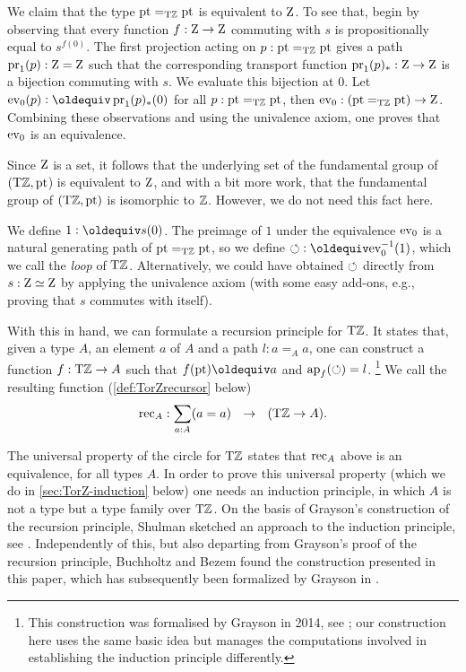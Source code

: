 \documentclass[a4paper,12pt]{amsart}
\begin{document}
{We claim}
that the type ${\mathord{\mathrm{pt}}} =_{\mathrm{T}\mathbb{Z}} {\mathord{\mathrm{pt}}}$ is equivalent to $\mathrm{Z}$.
To see that,
begin by observing that every function $f:\mathrm{Z}\to\mathrm{Z}$ commuting with $s$
is propositionally equal to $s^{f(0)}$.  The first projection
acting on $p : {\mathord{\mathrm{pt}}} =_{\mathrm{T}\mathbb{Z}} {\mathord{\mathrm{pt}}}$ gives a path $\operatorname{pr}_1(p) : \mathrm{Z}=\mathrm{Z}$
such that the corresponding transport function $\operatorname{pr}_1(p)_* : \mathrm{Z}\to\mathrm{Z}$
is a bijection commuting with $s$. We evaluate this bijection {at} $0$.
Let $\ev_0(p) \defeq \pr_1(p)_*(0)$ for all $p : {\mathord{\mathrm{pt}}} =_{\mathrm{T}\mathbb{Z}} {\mathord{\mathrm{pt}}}$,
then $\mathrm{ev}_0 : ({\mathord{\mathrm{pt}}} =_{\mathrm{T}\mathbb{Z}} {\mathord{\mathrm{pt}}}) \to \mathrm{Z}$.  Combining these observations {and}
using the univalence axiom, one proves that $\mathrm{ev}_0$ is an equivalence.

Since $\mathrm{Z}$ is a set, it follows that the underlying set of the fundamental group of $({\mathrm{T}\mathbb{Z}},{\mathord{\mathrm{pt}}}$) is equivalent to $\mathrm{Z}$,
and with a bit more work, that the fundamental group of $({\mathrm{T}\mathbb{Z}},{\mathord{\mathrm{pt}}})$ is isomorphic to $\mathbb{Z}$.
However, we do not need this fact here.

We define $1 \defeq s(0)$.
The preimage of $1$ under the equivalence $\mathrm{ev}_0$ is a
natural generating path of ${\mathord{\mathrm{pt}}} =_{\mathrm{T}\mathbb{Z}} {\mathord{\mathrm{pt}}}$, so we define
${\Zloop}\defeq \ev_0^{-1}(1)$, which we call the \emph{loop}
of ${\mathrm{T}\mathbb{Z}}$. Alternatively, we could have obtained ${\circlearrowleft}$
directly from $s: \mathrm{Z}\simeq\mathrm{Z}$ by applying the univalence axiom
(with some easy add-ons, e.g., proving that $s$ commutes with itself).

With this in hand, we can formulate a recursion principle for ${\mathrm{T}\mathbb{Z}}$.
It states that, given a type $A$, an element $a$ of $A$ and a
path $l:a=_A a$, one can construct a function $f:{\mathrm{T}\mathbb{Z}}\to A$
such that $f(\pt)\jdeq a$ and $\mathop{{\mathrm{ap}}_{f}}({\circlearrowleft})=l$.%
\footnote{This construction was formalised by Grayson
in 2014, see \cite{circlerec-Dan}; our construction here uses the
same basic idea but manages the computations involved in establishing the
induction principle differently.}  We call the resulting function
(\cref{def:TorZrecursor} below)
\[
{\mathop{\mathrm{rec}}}_A : \sum_{a:A}(a=a) ~~\to~~ ({\mathrm{T}\mathbb{Z}} \to A).
\]

The universal property of the circle for ${\mathrm{T}\mathbb{Z}}$
states that ${\mathop{\mathrm{rec}}}_A$ above is an equivalence, for all types $A$.
In order to prove this universal property (which we do in \cref{sec:TorZ-induction} below)
one needs an induction
principle, in which $A$ is not a type but a type family over ${\mathrm{T}\mathbb{Z}}$.
On the basis of Grayson's construction of the recursion principle,
Shulman sketched an approach to the induction principle, see \cite{circleind-Mike}.
Independently of this, but also departing from Grayson's proof of the
recursion principle, Buchholtz and Bezem found the construction
presented in this paper, which has subsequently been formalized
by Grayson \cite{circleind-Dan,circleind-Dan-theorem} in \UniMath.
\end{document}
